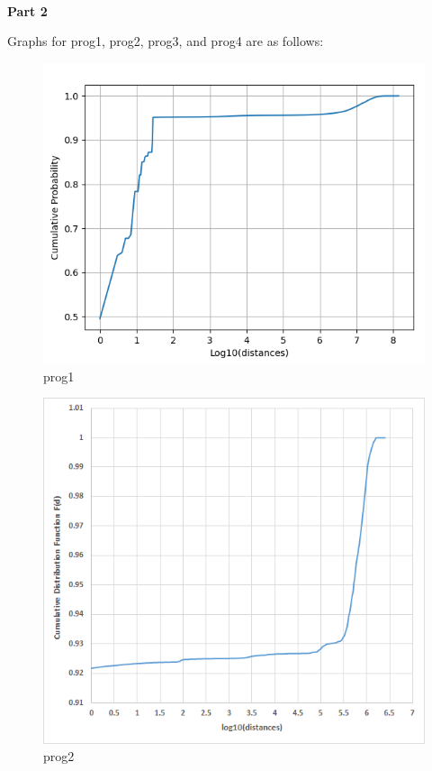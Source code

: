 \documentclass[12pt,oneside,reqno]{amsart}
\begin{document}
\begin{LARGE}
		\textbf{\\Part 2\\ }
	\end{LARGE}
Graphs for prog1, prog2, prog3, and prog4 are as follows:\\
	\begin{figure}[h]
    \centering
		\includegraphics[scale=1]{q2_prog1.png}
    	\caption{prog1}
\end{figure}
\newpage
\begin{figure}[h]
    \centering
		\includegraphics[scale=1.1]{q2_prog2.png}
    	\caption{prog2}
\end{figure}
\end{document}
